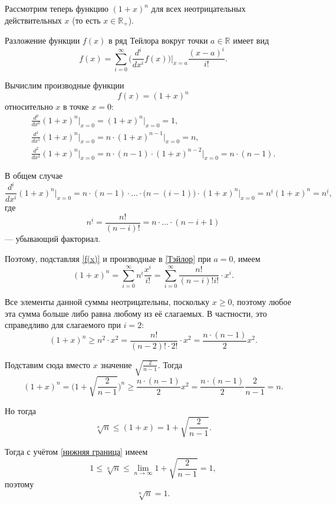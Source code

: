 \documentclass[labwork]{fefudoc}
\begin{document}
Рассмотрим теперь функцию $(1 + x)^n$ для всех неотрицательных действительных $x$ (то есть $x \in \mathbb{R}_+$).

Разложение функции $f(x)$ в ряд Тейлора вокруг точки $a \in \mathbb{R}$ имеет вид
\begin{equation}\label{Тэйлор}
f(x) = \sum_{i = 0}^\infty \Big(\frac{d^i}{d x^i} f(x)\Big)\Big\vert_{x = a} \frac{(x - a)^i}{i!}.
\end{equation}

Вычислим производные функции
\begin{equation}\label{f(x)}
f(x) = (1 + x)^n
\end{equation}
относительно $x$ в точке $x=0$:
\begin{gather*}
\frac{d^0}{d x^0} (1 + x)^n\vert_{x = 0} = (1 + x)^n\vert_{x = 0} = 1, \\
\frac{d^1}{d x^1} (1 + x)^n\vert_{x = 0} = n \cdot (1 + x)^{n-1}\vert_{x = 0} = n, \\
\frac{d^2}{d x^2} (1 + x)^n\vert_{x = 0} = n \cdot (n - 1) \cdot (1 + x)^{n-2}\vert_{x = 0} = n \cdot (n - 1).
\end{gather*}

В общем случае
$$
\frac{d^i}{d x^i} (1 + x)^n\vert_{x = 0}
 = n \cdot (n - 1) \cdot \ldots \cdot \big(n - (i - 1)\big) \cdot (1 + x)^n \vert_{x = 0}
 = n^{\underline{i}} (1+x)^n
 = n^{\underline{i}},
$$
где $$n^{\underline{i}} = \frac{n!}{(n-i)!} = n \cdot \ldots \cdot (n - i + 1)$$ --- убывающий факториал.

Поэтому, подставляя \eqref{f(x)} и производные в \eqref{Тэйлор} при $a = 0$, имеем
$$
(1 + x)^n = \sum_{i=0}^\infty n^{\underline{i}} \frac{x^i}{i!}
 = \sum_{i=0}^\infty \frac{n!}{(n-i)!i!} \cdot x^i.
$$

Все элементы данной суммы неотрицательны, поскольку $x \geq 0$, поэтому любое эта сумма больше либо равна любому из её слагаемых.
В частности, это справедливо для слагаемого при $i = 2$:
$$
(1 + x)^n
 \geq n^{\underline{2}} \cdot x^2
 = \frac{n!}{(n-2)! \cdot 2!} \cdot x^2
 = \frac{n \cdot (n-1)}{2} x^2.
$$

Подставим сюда вместо $x$ значение $\sqrt{\frac{2}{n-1}}$.
Тогда
$$
(1 + x)^n = \Big(1 + \sqrt{\frac{2}{n-1}}\Big)^n
 \geq \frac{n \cdot (n-1)}{2} x^2
 = \frac{n \cdot (n-1)}{2} \frac{2}{n-1}
 = n.
$$

Но тогда
$$
\sqrt[n]{n} \leq (1 + x) = 1 + \sqrt{\frac{2}{n-1}}.
$$

Тогда с учётом \eqref{нижняя граница} имеем
$$
1 \leq \sqrt[n]{n} \leq \lim_{n\to\infty} 1 + \sqrt{\frac{2}{n-1}} = 1,
$$
поэтому
$$
\sqrt[n]{n} = 1.
$$
\end{document}
